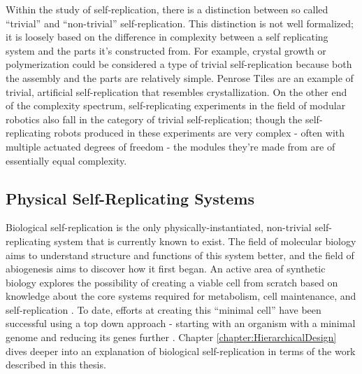 {%
%
%


Within the study of self-replication, there is a distinction between so called ``trivial'' and ``non-trivial'' self-replication.  This distinction is not well formalized; it is loosely based on the difference in complexity between a self replicating system and the parts it's constructed from.  For example, crystal growth or polymerization could be considered a type of trivial self-replication because both the assembly and the parts are relatively simple.  Penrose Tiles \cite{Penrose1958} are an example of trivial, artificial self-replication that resembles crystallization.  On the other end of the complexity spectrum, self-replicating experiments in the field of modular robotics also fall in the category of trivial self-replication; though the self-replicating robots produced in these experiments are very complex  \cite{Zykov2005} - often with multiple actuated degrees of freedom - the modules they're made from are of essentially equal complexity.

\subsection{Physical Self-Replicating Systems}

Biological self-replication is the only physically-instantiated, non-trivial self-replicating system that is currently known to exist.  The field of molecular biology aims to understand structure and functions of this system better, and the field of abiogenesis aims to discover how it first began.  An active area of synthetic biology explores the possibility of creating a viable cell from scratch based on knowledge about the core systems required for metabolism, cell maintenance, and self-replication \cite{Forster2006}.  To date, efforts at creating this ``minimal cell'' have been successful using a top down approach - starting with an organism with a minimal genome and reducing its genes further \cite{Glass2006} \cite{Gibson2010} \cite{Iii2016}.  Chapter \ref{chapter:HierarchicalDesign} dives deeper into an explanation of biological self-replication in terms of the work described in this thesis. 

}
